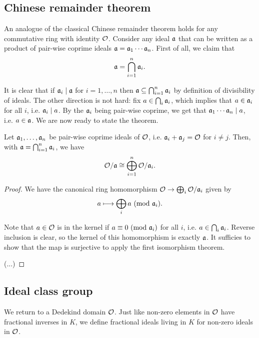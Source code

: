 \subsection{Chinese remainder theorem}

An analogue of the classical Chinese remainder theorem holds for any commutative ring with identity $\mathcal{O}$. Consider any ideal $\mathfrak{a}$ that can be written as a product of pair-wise coprime ideals $\mathfrak{a}=\mathfrak{a}_1\cdots\mathfrak{a}_n$. First of all, we claim that
\[
	\mathfrak{a} = \bigcap_{i=1}^n \mathfrak{a}_i.
\]

It is clear that if $\mathfrak{a}_i\mid\mathfrak{a}$ for $i=1,\dots,n$ then $\mathfrak{a}\subseteq\bigcap_{i=1}^n \mathfrak{a}_i$ by definition of divisibility of ideals. The other direction is not hard: fix $a\in\bigcap_i\mathfrak{a}_i$, which implies that $a\in\mathfrak{a}_i$ for all $i$, i.e. $\mathfrak{a}_i\mid a$. By the $\mathfrak{a}_i$ being pair-wise coprime, we get that $\mathfrak{a}_1\cdots\mathfrak{a}_n\mid a$, i.e. $a\in\mathfrak{a}$. We are now ready to state the theorem.

\begin{theorem}
	Let $\mathfrak{a}_1,\dots,\mathfrak{a}_n$ be pair-wise coprime ideals of $\mathcal{O}$, i.e. $\mathfrak{a}_i+\mathfrak{a}_j=\mathcal{O}$ for $i\neq j$. Then, with $\mathfrak{a}=\bigcap_{i=1}^n\mathfrak{a}_i$, we have
	\[
		\mathcal{O}/\mathfrak{a} \cong \bigoplus_{i=1}^n\mathcal{O}/\mathfrak{a}_i.
	\]
\end{theorem}
\begin{proof}
	We have the canonical ring homomorphism $\mathcal{O}\to\bigoplus_i\mathcal{O}/\mathfrak{a}_i$ given by
	\begin{align*}
		a \longmapsto \bigoplus_i a\ (\mathrm{mod}\ \mathfrak{a}_i).
	\end{align*}

	Note that $a\in\mathcal{O}$ is in the kernel if $a\equiv 0\ (\mathrm{mod}\ \mathfrak{a}_i)$ for all $i$, i.e. $a\in\bigcap_i\mathfrak{a}_i$. Reverse inclusion is clear, so the kernel of this homomorphism is exactly $\mathfrak{a}$. It sufficies to show that the map is surjective to apply the first isomorphism theorem.

	(...)
	
\end{proof}



\subsection{Ideal class group}

We return to a Dedekind domain $\mathcal{O}$. Just like non-zero elements in $\mathcal{O}$ have fractional inverses in $K$, we define fractional ideals living in $K$ for non-zero ideals in $\mathcal{O}$.

